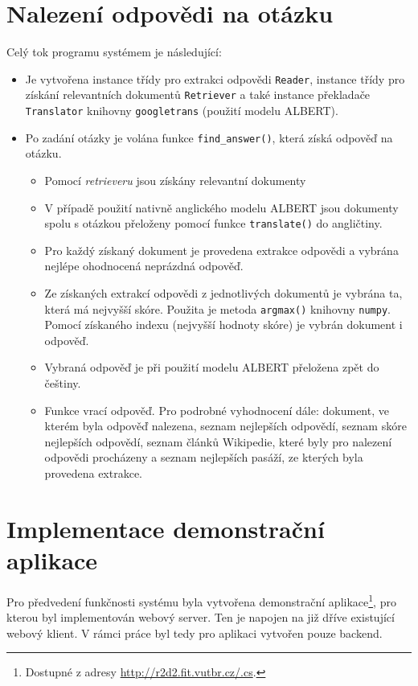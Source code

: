 \section*{Nalezení odpovědi na otázku}
Celý tok programu systémem je následující:
\begin{itemize}
    \item Je vytvořena instance třídy pro extrakci odpovědi \texttt{Reader}, instance třídy pro získání relevantních dokumentů \texttt{Retriever} a také instance překladače \texttt{Translator} knihovny \texttt{googletrans} (použití modelu ALBERT).
    
    \item Po zadání otázky je volána funkce \texttt{find\_answer()}, která získá odpověď na otázku.
    \begin{itemize}
        \item Pomocí \emph{retrieveru} jsou získány relevantní dokumenty
        \item V případě použití nativně anglického modelu ALBERT jsou dokumenty spolu s otázkou přeloženy pomocí funkce \texttt{translate()} do angličtiny.
        \item Pro každý získaný dokument je provedena extrakce odpovědi a vybrána nejlépe ohodnocená neprázdná odpověď.
        \item Ze získaných extrakcí odpovědi z jednotlivých dokumentů je vybrána ta, která má nejvyšší skóre. Použita je metoda \texttt{argmax()} knihovny \texttt{numpy}. Pomocí získaného indexu (nejvyšší hodnoty skóre) je vybrán dokument i odpověď.
        \item Vybraná odpověď je při použití modelu ALBERT přeložena zpět do češtiny.
        \item Funkce vrací odpověď. Pro podrobné vyhodnocení dále: dokument, ve kterém byla odpověď nalezena, seznam nejlepších odpovědí, seznam skóre nejlepších odpovědí, seznam článků Wikipedie, které byly pro nalezení odpovědi procházeny a seznam nejlepších pasáží, ze kterých byla provedena extrakce.
    \end{itemize}
\end{itemize}

\section*{Implementace demonstrační aplikace}
Pro předvedení funkčnosti systému byla vytvořena demonstrační aplikace\footnote{Dostupné z adresy \url{http://r2d2.fit.vutbr.cz/.cs}.}, pro kterou byl implementován webový server. Ten je napojen na již dříve existující webový klient. V rámci práce byl tedy pro aplikaci vytvořen pouze backend.

